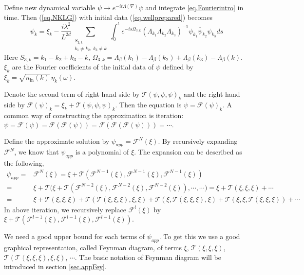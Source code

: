 Define new dynamical variable $\psi\rightarrow e^{- it\Lambda(\nabla)} \psi$ and integrate \eqref{eq.Fourierintro} in time. Then  (\ref{eq.NKLG}) with initial data (\ref{eq.wellprepared}) becomes
\begin{equation}\label{eq.intmainintro}
    \psi_k=\xi_k-\frac{i\lambda^2}{L^{2d}} \sum\limits_{\substack{S_{3,k} \\  k_1\ne k_2,\ k_3 \ne k}}
    \int^t_0 e^{- is \Omega_{3,k}} (\Lambda_{k_1}\Lambda_{k_2}\Lambda_{k_3})^{-1}\psi_{k_1}\overline{\psi}_{k_2}  \psi_{k_3} ds
\end{equation}
Here $S_{3,k}=k_1-k_2+k_3-k$, $\Omega_{3,k}=\Lambda_\beta(k_1)-\Lambda_\beta(k_2)+\Lambda_\beta(k_3)-\Lambda_\beta(k)$. $\xi_k$ are the Fourier coefficients of the initial data of $\psi$ defined by $\xi_k=\sqrt{n_{\textrm{in}}(k)} \, \eta_{k}(\omega)$.



Denote the second term of right hand side by $\mathcal{T}(\psi,\psi,\psi)_k$ and the right hand side by $\mathcal{F}(\psi)_k=\xi_k+\mathcal{T}(\psi,\psi,\psi)_k$. Then the equation is $\psi=\mathcal{F}(\psi)_k$. A common way of constructing the approximation is iteration: $\psi=\mathcal{F}(\psi)=\mathcal{F}(\mathcal{F}(\psi))=\mathcal{F}(\mathcal{F}(\mathcal{F}(\psi)))=\cdots$. 

Define the approximate solution by $\psi_{app}=\mathcal{F}^{N}(\xi)$. By recursively expanding  $\mathcal{F}^{N}$, we know that $\psi_{app}$ is a polynomial of $\xi$.
The expansion can be described as the following,
\begin{equation*}
\begin{split}
    \psi_{app}=&\mathcal{F}^{N}(\xi)=\xi+\mathcal{T}(\mathcal{F}^{N-1}(\xi),\mathcal{F}^{N-1}(\xi),\mathcal{F}^{N-1}(\xi))
    \\
    =&\xi+\mathcal{T}\Big(\xi+\mathcal{T}(\mathcal{F}^{N-2}(\xi),\mathcal{F}^{N-2}(\xi),\mathcal{F}^{N-2}(\xi)),
    \cdots,
    \cdots\Big)=\xi+\mathcal{T}(\xi,\xi,\xi)+\cdots
    \\
    =&\xi+\mathcal{T}(\xi,\xi,\xi)+\mathcal{T}(\mathcal{T}(\xi,\xi,\xi),\xi,\xi)
    +\mathcal{T}(\xi,\mathcal{T}(\xi,\xi,\xi),\xi)
    +\mathcal{T}(\xi,\xi,\mathcal{T}(\xi,\xi,\xi))+\cdots
\end{split}    
\end{equation*}
In above iteration, we recursively replace $\mathcal{F}^{l}(\xi)$ by $\xi+\mathcal{T}(\mathcal{F}^{l-1}(\xi),\mathcal{F}^{l-1}(\xi),\mathcal{F}^{l-1}(\xi))$.

We need a good upper bound for each terms of $\psi_{app}$. To get this we use a good graphical representation, called Feynman diagram, of terms $\xi$, $\mathcal{T}(\xi,\xi,\xi)$, $\mathcal{T}(\mathcal{T}(\xi,\xi,\xi),\xi,\xi)$, $\cdots$. The basic notation of Feynman diagram will be introduced in section \ref{sec.appFey}.

